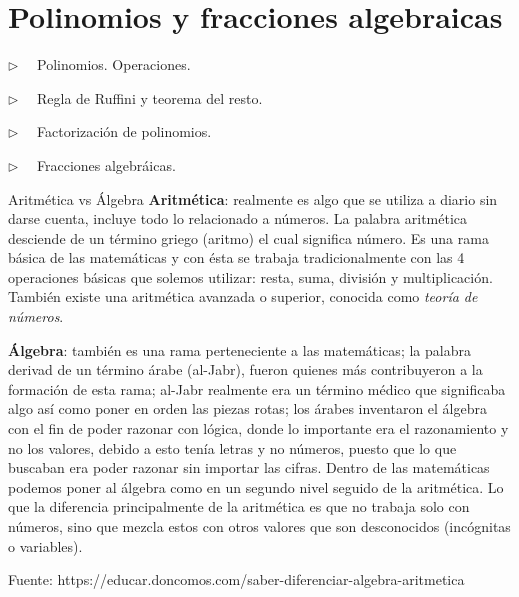 \chapter{Polinomios y fracciones algebraicas}
	
	
\vspace{15mm}


\begin{adjustwidth}{40pt}{40pt}
\begin{cuadro-gris}

	\begin{multicols}{2}
	$\triangleright \quad$ Polinomios. Operaciones.
	
	$\triangleright \quad$ Regla de Ruffini y teorema del resto.
	
	$\triangleright \quad$ Factorización de polinomios.
	
	$\triangleright \quad$ Fracciones algebráicas.
	\end{multicols}
	
\end{cuadro-gris}
\end{adjustwidth}


\vspace{1cm}

\begin{myexampleblock}{Aritmética vs Álgebra}
\vspace{2mm} \textbf{Aritmética}: realmente es algo que se utiliza a diario sin darse cuenta, incluye todo lo relacionado a números. La palabra aritmética desciende de un término griego (aritmo) el cual significa número. Es una rama básica de las matemáticas y con ésta se trabaja tradicionalmente con las 4 operaciones básicas que solemos utilizar: resta, suma, división y multiplicación. También existe una aritmética avanzada o superior, conocida como \emph{teoría de números}.


\vspace{2mm} \textbf{Álgebra}: también es una rama perteneciente a las matemáticas; la palabra  derivad de un término árabe (al-Jabr), fueron quienes más contribuyeron a la formación de esta rama; al-Jabr realmente era un término médico que significaba algo así como poner en orden las piezas rotas; los árabes inventaron el álgebra con el fin de poder razonar con lógica, donde lo importante era el razonamiento y no los valores, debido a esto tenía letras y no números, puesto que lo que buscaban era poder razonar sin importar las cifras. Dentro de las matemáticas podemos poner al álgebra como en un segundo nivel seguido de la aritmética. Lo que la diferencia principalmente de la aritmética es que no trabaja solo con números, sino que mezcla estos con otros valores que son desconocidos (incógnitas o variables).

\vspace{2mm} \textcolor{gris}{Fuente: https://educar.doncomos.com/saber-diferenciar-algebra-aritmetica}	

\end{myexampleblock}


